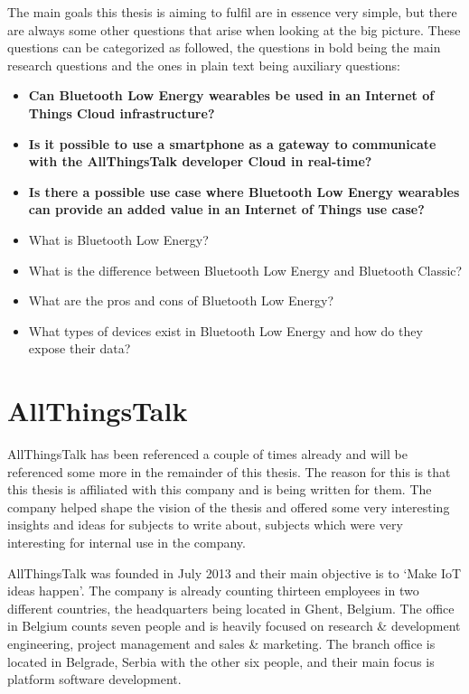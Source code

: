 \documentclass[pdftex,a4paper,12pt,twoside]{report}
\begin{document}
The main goals this thesis is aiming to fulfil are in essence very simple, but there are always some other questions that arise when looking at the big picture. These questions can be categorized as followed, the questions in bold being the main research questions and the ones in plain text being auxiliary questions:
\begin{itemize}
	\item{\textbf{Can Bluetooth Low Energy wearables be used in an Internet of Things Cloud infrastructure?}}
	\item{\textbf{Is it possible to use a smartphone as a gateway to communicate with the AllThingsTalk developer Cloud in real-time?}}
	\item{\textbf{Is there a possible use case where Bluetooth Low Energy wearables can provide an added value in an Internet of Things use case?}}
	\item{What is Bluetooth Low Energy?}
	\item{What is the difference between Bluetooth Low Energy and Bluetooth Classic?}
	\item{What are the pros and cons of Bluetooth Low Energy?}
	\item{What types of devices exist in Bluetooth Low Energy and how do they expose their data?}
\end{itemize}

\section{AllThingsTalk}
\label{sec:allthingstalk}
AllThingsTalk has been referenced a couple of times already and will be referenced some more in the remainder of this thesis. The reason for this is that this thesis is affiliated with this company and is being written for them. The company helped shape the vision of the thesis and offered some very interesting insights and ideas for subjects to write about, subjects which were very interesting for internal use in the company.

AllThingsTalk was founded in July 2013 and their main objective is to `Make IoT ideas happen'. The company is already counting thirteen employees in two different countries, the headquarters being located in Ghent, Belgium. The office in Belgium counts seven people and is heavily focused on research \& development engineering, project management and sales \& marketing. The branch office is located in Belgrade, Serbia with the other six people, and their main focus is platform software development.
\end{document}
